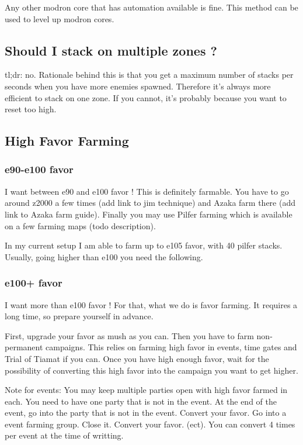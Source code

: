 \documentclass{article}
\begin{document}
Any other modron core that has automation available is fine.
This method can be used to level up modron cores.


\subsection{Should I stack on multiple zones ?}

tl;dr: no.
Rationale behind this is that you get a maximum number of stacks per seconds when you have more enemies spawned.
Therefore it's always more efficient to stack on one zone.
If you cannot, it's probably because you want to reset too high.

\subsection{High Favor Farming}

\subsubsection{e90-e100 favor}
I want between e90 and e100 favor !
This is definitely farmable.
You have to go around z2000 a few times (add link to jim technique) and Azaka farm there (add link to Azaka farm guide).
Finally you may use Pilfer farming which is available on a few farming maps (todo description).

In my current setup I am able to farm up to e105 favor, with 40 pilfer stacks.
Usually, going higher than e100 you need the following.

\subsubsection{e100+ favor}

I want more than e100 favor !
For that, what we do is favor farming.
It requires a long time, so prepare yourself in advance.

First, upgrade your favor as mush as you can.
Then you have to farm non-permanent campaigns.
This relies on farming high favor in events, time gates and Trial of Tiamat if you can.
Once you have high enough favor, wait for the possibility of converting this high favor into the campaign you want to get higher.

Note for events:
You may keep multiple parties open with high favor farmed in each.
You need to have one party that is not in the event.
At the end of the event, go into the party that is not in the event.
Convert your favor.
Go into a event farming group.
Close it.
Convert your favor.
(ect).
You can convert 4 times per event at the time of writting.
\end{document}
